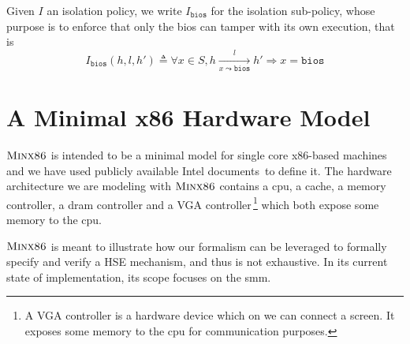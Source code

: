 \begin{definition}
  \label{def:speccert:biospol}
  Given $I$ an isolation policy, we write $I_{\mathtt{bios}}$ for the isolation
  sub-policy, whose purpose is to enforce that only the \ac{bios} can tamper
  with its own execution, that is
  \[
    I_{\mathtt{bios}}(h, l, h') \triangleq \forall x \in S, h \xrightarrow[x
    \leadsto \mathtt{bios}]{l} h' \Rightarrow x = \mathtt{bios}
  \]
\end{definition}

%

\section{A Minimal x86 Hardware Model}
\label{sec:speccert2:minx86}

$\textsc{Minx86}$ is intended to be a minimal model for single core x86-based
machines and we have used publicly available Intel
documents\,\cite{intel2013celeron,intel2009mch,intel2014manual} to define it.
%
The hardware architecture we are modeling with $\textsc{Minx86}$ contains a
\ac{cpu}, a cache, a memory controller, a \ac{dram} controller and a VGA
controller\,\footnote{A VGA controller is a hardware device which on we can
  connect a screen. It exposes some memory to the \ac{cpu} for communication
  purposes.} which both expose some memory to the \ac{cpu}.

$\textsc{Minx86}$ is meant to illustrate how our formalism can be leveraged
to formally specify and verify a HSE mechanism, and thus is not exhaustive.
%
%
In its current state of implementation, its scope focuses on the \ac{smm}.

